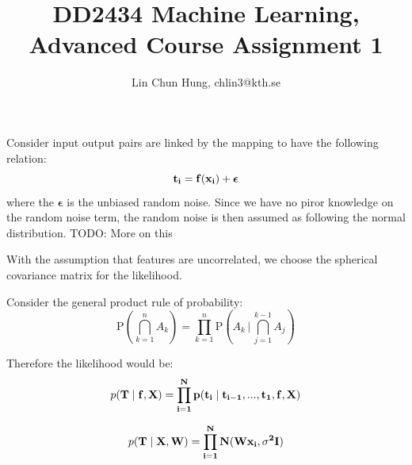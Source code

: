 \documentclass[12pt]{article}
\newenvironment{question}[2][Question]{\begin{trivlist}
\kern10pt
\item[\hskip \labelsep {\bfseries #1}\hskip \labelsep {\bfseries #2.}]}{\end{trivlist}}
\begin{document}
 
 
 
\title{DD2434 Machine Learning, Advanced Course Assignment 1}
\author{Lin Chun Hung, chlin3@kth.se} 
 
\maketitle


\begin{question}{1}
Consider input output pairs are linked by the mapping to have the following
 relation:
$$ 
    \bf{t}_i = f(\bf{x}_i) + \bm{\epsilon}
$$
where the $\bm{\epsilon}$ is the unbiased random noise. Since we have no piror knowledge
on the random noise term, the random noise is then assumed as following the normal
distribution. TODO: More on this \par

With the assumption that features are uncorrelated, we choose the spherical
covariance matrix for the likelihood.
\end{question}



\begin{question}{2}
Consider the general product rule of probability:
$$\mathrm {P} \left(\bigcap _{k=1}^{n}A_{k}\right)=
  \prod _{k=1}^{n}\mathrm {P} \left(A_{k}\,{\Bigg |}\,\bigcap _{j=1}^{k-1}A_{j}\right)$$

Therefore the likelihood would be:
$$ 
  p(\bf{T}\mid f,\bf{X}) =
  \prod _{i=1}^{N}p(\bf{t}_i \mid \bf{t}_{i-1},...,\bf{t}_{1},
  f,\bf{X})
$$

\end{question} 


\begin{question}{3}

$$ 
  p(\bf{T}\mid \bf{X},\bf{W}) =
  \prod _{i=1}^{N}N(\bf{W}\bf{x}_i, \sigma^2\bf{I})
$$

\end{question}
\end{document}
